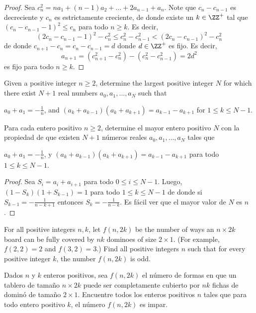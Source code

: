 \begin{proof}
	Sea $c_n^2=na_1+(n-1)a_2+\dots+2a_{n-1}+a_n$. Note que $c_n-c_{n-1}$ es decreciente y $c_n$ es estrictamente creciente, de donde existe un $k\in\ZZ^+$ tal que $(c_n-c_{n-1}-1)^2\le c_n$ para todo $n\ge k$. Es decir,
	\[(2c_n-c_{n-1}-1)^2-c_n^2\le c_n^2-c_{n-1}^2<(2c_n-c_{n-1})^2-c_n^2\]
	de donde $c_{n+1}-c_n=c_n-c_{n-1}=d$ donde $d\in\ZZ^+$ es fijo. Es decir,
	\[a_{n+1}=(c_{n+1}^2-c_n^2)-(c_n^2-c_{n-1}^2)=2d^2\]
	es fijo para todo $n\ge k$.
\end{proof}

\begin{probEG}[EGMO 2022/4]
	Given a positive integer $n\ge 2$, determine the largest positive integer $N$ for which there exist $N+1$ real numbers $a_0,a_1,\dots,a_N$ such that
	\begin{enumerate}[(1)]
		\ii $a_0+a_1=-\frac1n$, and
		\ii $(a_k+a_{k-1})(a_k+a_{k+1})=a_{k-1}-a_{k+1}$ for $1\le k\le N-1$.
	\end{enumerate}
	\begin{probSP}
		Para cada entero positivo $n\ge 2$, determine el mayor entero positivo $N$ con la propiedad de que existen $N+1$ números reales $a_0,a_1,\dots,a_N$ tales que
		\begin{enumerate}[(1)]
			\ii $a_0+a_1=-\frac1n$, y
			\ii $(a_k+a_{k-1})(a_k+a_{k+1})=a_{k-1}-a_{k+1}$ para todo $1\le k\le N-1$.
		\end{enumerate}
	\end{probSP}
\end{probEG}

\begin{proof}
	Sea $S_i=a_i+a_{i+1}$ para todo $0\le i\le N-1$. Luego, $(1-S_k)(1+S_{k-1})=1$ para todo $1\le k\le N-1$ de donde si $S_{k-1}=-\frac{1}{n-k+1}$ entonces $S_k=-\frac{1}{n-k}$. Es fácil ver que el mayor valor de $N$ es $n$.
\end{proof}

\begin{probEG}[EGMO 2022/5]
	For all positive integers $n,k$, let $f(n,2k)$ be the number of ways an $n\times 2k$ board can be fully covered by $nk$ dominoes of size $2\times 1$. (For example, $f(2,2)=2$ and $f(3,2)=3$.) Find all positive integers $n$ such that for every positive integer $k$, the number $f(n,2k)$ is odd.
	\begin{probSP}
		Dados $n$ y $k$ enteros positivos, sea $f(n,2k)$ el número de formas en que un tablero de tamaño $n\times 2k$ puede ser completamente cubierto por $nk$ fichas de dominó de tamaño $2\times 1$. Encuentre todos los enteros positivos $n$ tales que para todo entero positivo $k$, el número $f(n,2k)$ es impar.
	\end{probSP}
\end{probEG}


